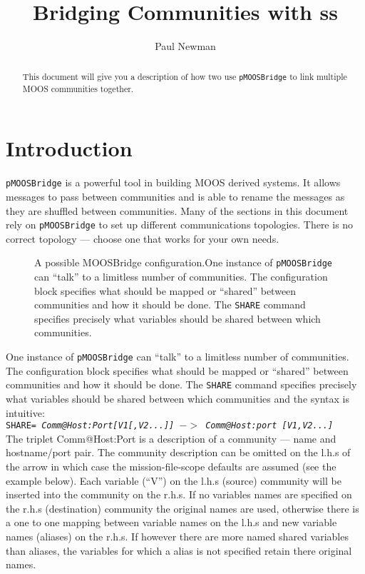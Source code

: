 \documentclass[a4paper,10pt]{article}
\title{Bridging Communities with \code{pMOOSBridge}ss}
\author{Paul Newman}
\newcommand{\Code}[1]{\texttt{#1} }
\newcommand{\code}[1]{\Code{#1} }
\begin{document}
\maketitle

\begin{center}
\end{center}
\begin{abstract}
This document will give you a description of how two use \code{pMOOSBridge} to link multiple MOOS communities together.
\end{abstract}

\section{Introduction}

\code{pMOOSBridge} is a powerful tool in building MOOS derived
systems. It allows messages to pass between communities and is
able to rename the messages as they are shuffled between
communities. Many of the sections in this document rely on
\code{pMOOSBridge} to set up different communications topologies. There is no correct topology --- choose one that
works for your own needs.
\begin{figure}[ht]
\centering {}
\caption{A possible MOOSBridge
configuration.One instance of \code{pMOOSBridge} can ``talk'' to a limitless
number of communities. The configuration block specifies what
should be mapped or ``shared'' between communities and how it
should be done. The \code{SHARE} command specifies precisely what
variables should be shared between which communities.}\label{fig:MOOSBridge1}
\end{figure}
One instance of \code{pMOOSBridge} can ``talk'' to a limitless
number of communities. The configuration block specifies what
should be mapped or ``shared'' between communities and how it
should be done. The \code{SHARE} command specifies precisely what
variables should be shared between which communities and the
syntax is intuitive:\\

\code{SHARE= {\it{Comm@Host:Port[V1[,V2...]] $->$ Comm@Host:port
[V1,V2...]}}}\\

The triplet Comm@Host:Port is a description of a community ---  name and hostname/port pair. The community
description can be omitted on the l.h.s of the arrow in which case the mission-file-scope defaults are assumed (see the example below).
Each variable (``V'') on the l.h.s (source) community will be inserted into the community on the r.h.s.
If no variables names are specified on the r.h.s (destination) community the original names are used, otherwise
there is a one to one mapping between variable names on the l.h.s and new variable names (aliases) on the r.h.s. If however
there are more named shared variables than aliases, the variables for which a alias is not specified retain there original names.
\end{document}
